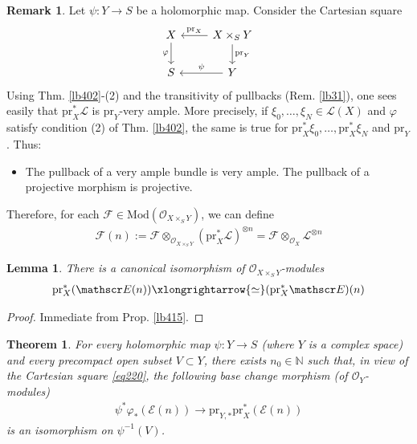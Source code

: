 \documentclass[12pt,b5paper,notitlepage]{report}
\theoremstyle{definition}
\newtheorem{rem}[df]{Remark}
\theoremstyle{plain}
\newtheorem{thm}[df]{Theorem}
\newtheorem{lm}[df]{Lemma}
\newcommand{\scr}{\mathscr}
\newcommand{\Nbb}{\mathbb N}
\newcommand{\pr}{\mathrm {pr}}
\newcommand{\Mod}{\mathrm{Mod}}
\numberwithin{equation}{section}
\begin{document}
\begin{rem}
Let $\psi:Y\rightarrow S$ be a holomorphic map. Consider the Cartesian square
\begin{equation}\label{eq220}
\begin{tikzcd}
X \arrow[d, "\varphi"'] & X\times_SY \arrow[l, "\pr_X"'] \arrow[d, "\pr_Y"] \\
S                       & Y \arrow[l, "\psi"']                              
\end{tikzcd}
\end{equation}
Using Thm. \ref{lb402}-(2) and the transitivity of pullbacks (Rem. \ref{lb31}), one sees easily that $\pr_X^*\scr L$ is $\pr_Y$-very ample. More precisely, if $\xi_0,\dots,\xi_N\in\scr L(X)$ and $\varphi$ satisfy condition (2) of Thm. \ref{lb402}, the same is true for $\pr_X^*\xi_0,\dots,\pr_X^*\xi_N$ and $\pr_Y$. Thus:
\begin{itemize}
\item The pullback of a very ample bundle is very ample. The pullback of a projective morphism is projective.
\end{itemize}
Therefore, for each $\scr F\in\Mod(\scr O_{X\times_SY})$, we can define
\begin{align}
\scr F(n):=\scr F\otimes_{\scr O_{X\times_SY}} (\pr_X^*\scr L)^{\otimes n}=\scr F\otimes_{\scr O_X}\scr L^{\otimes n}
\end{align}
\end{rem}

\begin{lm}\label{lb416}
There is a canonical isomorphism of $\scr O_{X\times_SY}$-modules 
\begin{align}
\pr_X^*(\scr E(n))\xlongrightarrow{\simeq}(\pr_X^*\scr E)(n)
\end{align}
\end{lm}


\begin{proof}
Immediate from Prop. \ref{lb415}.
\end{proof}







\begin{thm}\label{lb413}
For every holomorphic map $\psi:Y\rightarrow S$ (where $Y$ is a complex space) and every precompact open subset $V\subset Y$, there exists $n_0\in\Nbb$ such that, in view of the Cartesian square \eqref{eq220}, the following base change morphism (of $\scr O_Y$-modules)
\begin{align}
\psi^*\varphi_*(\scr E(n))\longrightarrow \pr_{Y,*}\pr_X^*(\scr E(n))  \label{eq219}
\end{align}
is an isomorphism on $\psi^{-1}(V)$. 
\end{thm}
\end{document}
